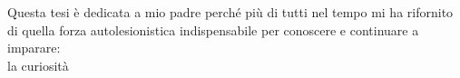 \thispagestyle{empty}
\vspace*{1em}
\begin{center}
\large Questa tesi è dedicata a mio padre perché più di tutti nel tempo mi ha rifornito
di quella forza autolesionistica indispensabile per conoscere e continuare a imparare:\\
{\Large\vspace{0.5em} la curiosità}
\end{center}
